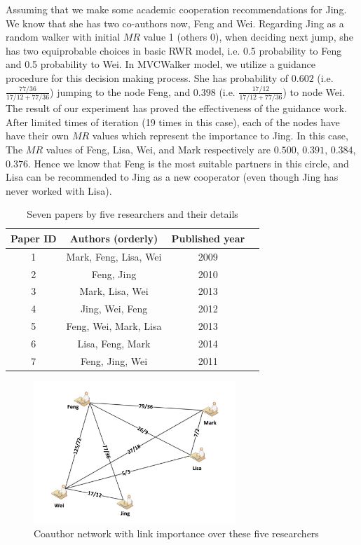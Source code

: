 \documentclass[10pt,journal,compsoc]{IEEEtran}
\begin{document}
Assuming that we make some academic cooperation recommendations for Jing. We know that she has two co-authors now, Feng and Wei. Regarding Jing as a random walker with initial $MR$ value 1 (others 0), when deciding next jump, she has two equiprobable choices in basic RWR model, i.e. 0.5 probability to Feng and 0.5 probability to Wei. In MVCWalker model, we utilize a guidance procedure for this decision making process. She has probability of $0.602$ (i.e. $\frac{77/36}{17/12+77/36}$) jumping to the node Feng, and $0.398$ (i.e. $\frac{17/12}{17/12+77/36}$) to node Wei. The result of our experiment has proved the effectiveness of the guidance work. After limited times of iteration (19 times in this case), each of the nodes have have their own $MR$ values which represent the importance to Jing. In this case, The $MR$ values of Feng, Lisa, Wei, and Mark respectively are $0.500$, $0.391$, $0.384$, $0.376$. Hence we know that Feng is the most suitable partners in this circle, and Lisa can be recommended to Jing as a new cooperator (even though Jing has never worked with Lisa).

\begin{table}
\renewcommand{\arraystretch}{1.2}
\centering
\caption{Seven papers by five researchers and their details}
\begin{tabular}{|c|c|c|c|} \hline
Paper ID&Authors (orderly)&Published year\\ \hline
1 & Mark, Feng, Lisa, Wei &2009 \\ \hline
2 & Feng, Jing &2010 \\ \hline
3 & Mark, Lisa, Wei &2013 \\ \hline
4 & Jing, Wei, Feng &2012 \\ \hline
5 & Feng, Wei, Mark, Lisa &2013 \\ \hline
6 & Lisa, Feng, Mark &2014 \\ \hline
7 & Feng, Jing, Wei &2011 \\ \hline

\hline\end{tabular}
\end{table}

\begin{figure}
\centering
\includegraphics [width=3in]{Fig-example.pdf}
\caption{Coauthor network with link importance over these five researchers}
\end{figure}
\end{document}
